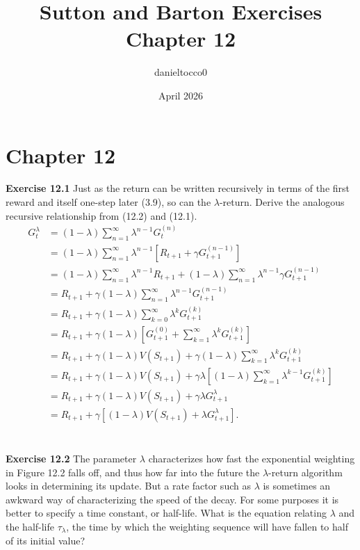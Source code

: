 \documentclass{article}
\title{Sutton and Barton Exercises Chapter 12}
\author{danieltocco0 }
\date{April 2026}
\begin{document}
\maketitle

\section{Chapter 12}


\textbf{Exercise 12.1} \quad Just as the return can be written recursively in terms of the first reward and 
itself one-step later (3.9), so can the $\lambda$-return. Derive the analogous recursive relationship 
from (12.2) and (12.1).
\\

\begin{align*}
G_t^\lambda 
&= (1-\lambda)\sum_{n=1}^{\infty} \lambda^{n-1} G_t^{(n)} \\
&= (1-\lambda)\sum_{n=1}^{\infty} \lambda^{n-1} \left[ R_{t+1} + \gamma G_{t+1}^{(n-1)} \right] \\
&= (1-\lambda)\sum_{n=1}^{\infty} \lambda^{n-1} R_{t+1}
+ (1-\lambda)\sum_{n=1}^{\infty} \lambda^{n-1} \gamma G_{t+1}^{(n-1)} \\
&= R_{t+1} + \gamma (1-\lambda)\sum_{n=1}^{\infty} \lambda^{n-1} G_{t+1}^{(n-1)} \\
&= R_{t+1} + \gamma (1-\lambda)\sum_{k=0}^{\infty} \lambda^k G_{t+1}^{(k)} \\
&= R_{t+1} + \gamma (1-\lambda)\left[ G_{t+1}^{(0)} + \sum_{k=1}^{\infty} \lambda^k G_{t+1}^{(k)} \right] \\
&= R_{t+1} + \gamma (1-\lambda) V(S_{t+1})
+ \gamma (1-\lambda)\sum_{k=1}^{\infty} \lambda^k G_{t+1}^{(k)} \\
&= R_{t+1} + \gamma (1-\lambda) V(S_{t+1})
+ \gamma \lambda \left[(1-\lambda)\sum_{k=1}^{\infty} \lambda^{k-1} G_{t+1}^{(k)} \right] \\
&= R_{t+1} + \gamma (1-\lambda) V(S_{t+1})
+ \gamma \lambda G_{t+1}^\lambda \\
&= R_{t+1} + \gamma \left[(1-\lambda) V(S_{t+1}) + \lambda G_{t+1}^\lambda \right].
\end{align*}
\\\\
\textbf{Exercise 12.2} \quad The parameter $\lambda$ characterizes how fast the exponential weighting in 
Figure 12.2 falls off, and thus how far into the future the $\lambda$-return algorithm looks in 
determining its update. But a rate factor such as $\lambda$ is sometimes an awkward way of 
characterizing the speed of the decay. For some purposes it is better to specify a time 
constant, or half-life. What is the equation relating $\lambda$ and the half-life $\tau_\lambda$, the time by 
which the weighting sequence will have fallen to half of its initial value?
\\
\\
\end{document}
